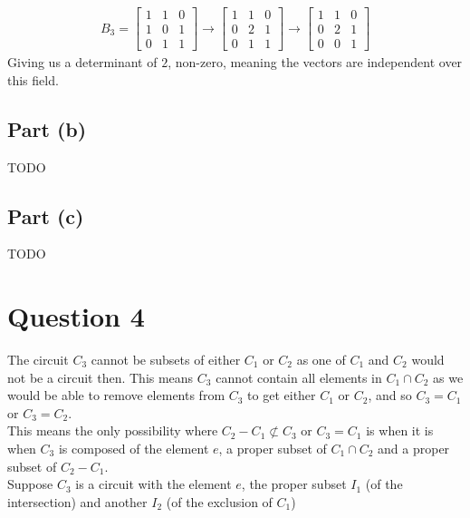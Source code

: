 \documentclass[a4paper, fleqn]{article}
\begin{document}
\begin{align*}
    B_3 = \begin{bmatrix}
    1 & 1 & 0 \\
    1 & 0 & 1 \\
    0 & 1 & 1
    \end{bmatrix}
    \rightarrow
    \begin{bmatrix}
    1 & 1 & 0 \\
    0 & 2 & 1 \\
    0 & 1 & 1
    \end{bmatrix}
    \rightarrow
    \begin{bmatrix}
    1 & 1 & 0 \\
    0 & 2 & 1 \\
    0 & 0 & 1
    \end{bmatrix}
\end{align*}
Giving us a determinant of $2$, non-zero, meaning the vectors are independent over this field.

\subsection*{Part (b)}
TODO

\subsection*{Part (c)}
TODO

\section*{Question 4}
The circuit $C_3$ cannot be subsets of either $C_1$ or $C_2$ as one of $C_1$ and $C_2$ would not be a circuit then. This means $C_3$ cannot contain all elements in $C_1\cap C_2$ as we would be able to remove elements from $C_3$ to get either $C_1$ or $C_2$, and so $C_3=C_1$ or $C_3=C_2$. \\
This means the only possibility where $C_2-C_1\not\subset C_3$ or $C_3=C_1$ is when it is when $C_3$ is composed of the element $e$, a proper subset of $C_1\cap C_2$ and a proper subset of $C_2-C_1$. \\
Suppose $C_3$ is a circuit with the element $e$, the proper subset $I_1$ (of the intersection) and another $I_2$ (of the exclusion of $C_1$)
\end{document}
